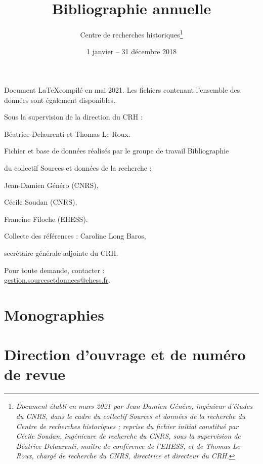 \documentclass{article}
\title{\textbf{Bibliographie annuelle}}
\author{Centre de recherches historiques\footnote{\textit{Document établi en mars 2021 par Jean-Damien Généro, ingénieur d'études du CNRS, dans le cadre du collectif Sources et données de la recherche du Centre de recherches historiques ; reprise du fichier initial constitué par Cécile Soudan, ingénieure de recherche du CNRS, sous la supervision de Béatrice Delaurenti, maître de conférence de l'EHESS, et de 
Thomas Le Roux, chargé de recherche du CNRS, directrice et directeur du CRH.}}}
\date{1\up{er} janvier -- 31 décembre 2018}
\begin{document}
\renewcommand{\contentsname}{Sommaire}


\newpage
\thispagestyle{empty}

\begin{center}
\begin{itshape}

Document \LaTeX compilé en mai 2021. Les fichiers  contenant l'ensemble des données sont également disponibles.

\medskip

Sous la supervision de la direction du CRH :

Béatrice Delaurenti et Thomas Le Roux.

\medskip

Fichier et base de données réalisés par le groupe de travail \og Bibliographie \fg

du collectif \og Sources et données de la recherche \fg :

Jean-Damien Généro (CNRS),

Cécile Soudan (CNRS),

Francine Filoche (EHESS).

\medskip

Collecte des références : Caroline Long Baros,

secrétaire générale adjointe du CRH.

\medskip

Pour toute demande, contacter :\\\url{gestion.sourcesetdonnees@ehess.fr}.

\end{itshape}
\end{center}
\newpage
\thispagestyle{empty}



\nocite{*}
\newpage

\section{Monographies}

\printbibliography[heading=subbibliography,keyword=monographie,heading=none]

\section{Direction d'ouvrage et de numéro de revue}
\end{document}
